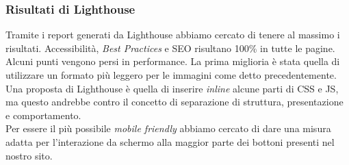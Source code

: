 \subsubsection{Risultati di Lighthouse}
Tramite i report generati da Lighthouse abbiamo cercato di tenere al massimo i risultati. Accessibilità, \textit{Best Practices} e SEO risultano 100\% in tutte le pagine.\\
Alcuni punti vengono persi in performance. La prima miglioria è stata quella di utilizzare un formato più leggero per le immagini come detto precedentemente.\\
Una proposta di Lighthouse è quella di inserire \textit{inline} alcune parti di CSS e JS, ma questo andrebbe contro il concetto di separazione di struttura, presentazione e comportamento.\\
Per essere il più possibile \textit{mobile friendly} abbiamo cercato di dare una misura adatta per l'interazione da schermo alla maggior parte dei bottoni presenti nel nostro sito.
